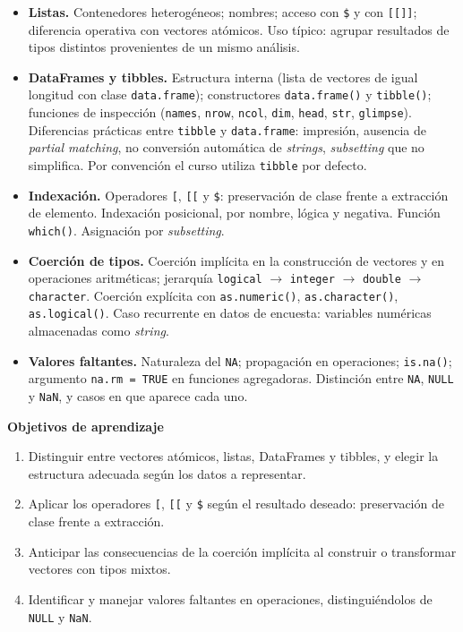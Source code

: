 \documentclass[11pt,letterpaper]{article}
\begin{document}
\begin{itemize}[leftmargin=*, itemsep=2pt]
    \item \textbf{Listas.} Contenedores heterogéneos; nombres; acceso con \texttt{\$} y con \texttt{[[]]}; diferencia operativa con vectores atómicos. Uso típico: agrupar resultados de tipos distintos provenientes de un mismo análisis.
    \item \textbf{DataFrames y tibbles.} Estructura interna (lista de vectores de igual longitud con clase \texttt{data.frame}); constructores \texttt{data.frame()} y \texttt{tibble()}; funciones de inspección (\texttt{names}, \texttt{nrow}, \texttt{ncol}, \texttt{dim}, \texttt{head}, \texttt{str}, \texttt{glimpse}). Diferencias prácticas entre \texttt{tibble} y \texttt{data.frame}: impresión, ausencia de \textit{partial matching}, no conversión automática de \textit{strings}, \textit{subsetting} que no simplifica. Por convención el curso utiliza \texttt{tibble} por defecto.
    \item \textbf{Indexación.} Operadores \texttt{[}, \texttt{[[} y \texttt{\$}: preservación de clase frente a extracción de elemento. Indexación posicional, por nombre, lógica y negativa. Función \texttt{which()}. Asignación por \textit{subsetting}.
    \item \textbf{Coerción de tipos.} Coerción implícita en la construcción de vectores y en operaciones aritméticas; jerarquía \texttt{logical} $\to$ \texttt{integer} $\to$ \texttt{double} $\to$ \texttt{character}. Coerción explícita con \texttt{as.numeric()}, \texttt{as.character()}, \texttt{as.logical()}. Caso recurrente en datos de encuesta: variables numéricas almacenadas como \textit{string}.
    \item \textbf{Valores faltantes.} Naturaleza del \texttt{NA}; propagación en operaciones; \texttt{is.na()}; argumento \texttt{na.rm = TRUE} en funciones agregadoras. Distinción entre \texttt{NA}, \texttt{NULL} y \texttt{NaN}, y casos en que aparece cada uno.
\end{itemize}

\medskip
\noindent\textbf{Objetivos de aprendizaje}
\begin{enumerate}[leftmargin=*, itemsep=1pt]
    \item Distinguir entre vectores atómicos, listas, DataFrames y tibbles, y elegir la estructura adecuada según los datos a representar.
    \item Aplicar los operadores \texttt{[}, \texttt{[[} y \texttt{\$} según el resultado deseado: preservación de clase frente a extracción.
    \item Anticipar las consecuencias de la coerción implícita al construir o transformar vectores con tipos mixtos.
    \item Identificar y manejar valores faltantes en operaciones, distinguiéndolos de \texttt{NULL} y \texttt{NaN}.
\end{enumerate}
\end{document}
